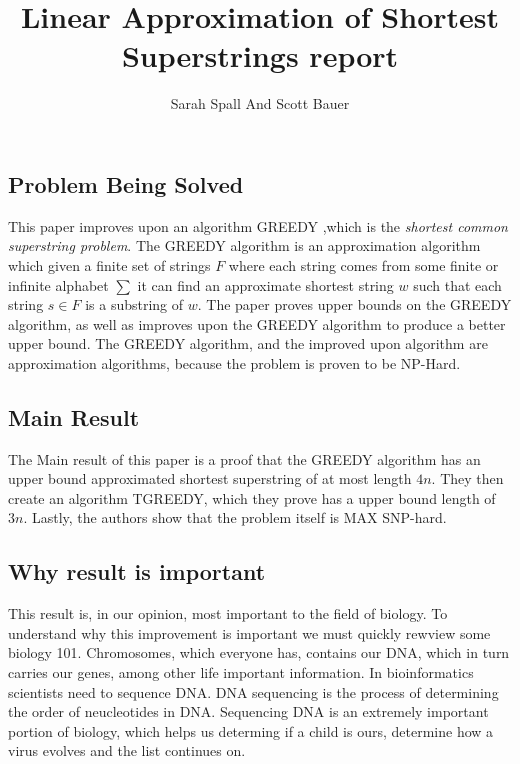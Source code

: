 \documentclass[letterpaper,twocolumn,11pt]{article}
\title{Linear Approximation of Shortest Superstrings report}
\author[1]{Sarah Spall And Scott Bauer}
\begin{document}
\maketitle
\newpage

\subsection*{Problem Being Solved}

This paper improves upon an algorithm GREEDY \cite{tarhio1988greedy},which is the \textit{shortest common superstring problem}. The GREEDY algorithm is an approximation algorithm which given a finite set of strings $F$ where each string comes from some finite or infinite alphabet $\sum$ it can find an approximate shortest string $w$ such that each string $s \in F$ is a substring of $w$. The paper proves upper bounds on the GREEDY algorithm, as well as improves upon the GREEDY algorithm to produce a better upper bound. The GREEDY algorithm, and the improved upon algorithm are approximation algorithms, because the problem is proven to be NP-Hard. \cite{gallant1980finding}
 


\subsection*{Main Result}

The Main result of this paper is a proof that the GREEDY algorithm has an upper bound approximated shortest superstring of at most length $4n$. They then create an algorithm TGREEDY, which they prove has a upper bound length of $3n$. Lastly, the authors show that the problem itself is MAX SNP-hard.

\subsection*{Why result is important}

This result is, in our opinion, most important to the field of biology. To understand why this improvement is important we must quickly rewview some biology 101. Chromosomes, which everyone has, contains our DNA, which in turn carries our genes, among other life important information. In bioinformatics scientists need to sequence DNA. DNA sequencing is the process of determining the order of neucleotides in DNA. Sequencing DNA is an extremely important portion of biology, which helps us determing if a child is ours, determine how a virus evolves and the list continues on. 
\end{document}
